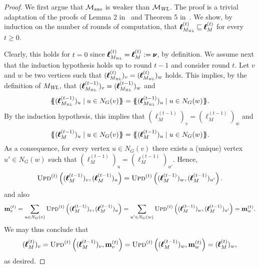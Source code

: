 \begin{proof}
We first argue that $\mathcal{M}_{\textsl{ano}}$ is weaker than $\mathcal{M}_{\textsl{WL}}$. The proof is a trivial adaptation of the proofs of Lemma 2 in~\cite{xhlj19} and Theorem 5 in~\cite{grohewl}. We show, by induction on the number of rounds of computation, that  $\pmb{\ell}_{M_{\textsl{WL}}}^{(t)}\sqsubseteq \pmb{\ell}_M^{(t)}$ for every $t\geq 0$.

Clearly, this holds for $t=0$ since $\pmb{\ell}_{M_{\textsl{WL}}}^{(t)}=\pmb{\ell}_M^{(t)}:=\pmb{\nu}$, by definition.
We assume next that the induction hypothesis holds up to round $t-1$ and consider round $t$.
Let $v$ and $w$ be two vertices such that 
$(\pmb{\ell}_{M_{\textsl{WL}}}^{(t)})_v=(\pmb{\ell}_{M_{\textsl{WL}}}^{(t)})_w$ holds.
This implies, by the definition of $M_{\textsl{WL}}$, that $(\pmb{\ell}_{M_{\textsl{WL}}}^{(t-1)})_v=(\pmb{\ell}_{M_{\textsl{WL}}}^{(t-1)})_w$  and
$$
\ldbl (\pmb{\ell}_{M_{\textsl{WL}}}^{(t-1)})_u\mid u\in N_G(v) \rdbl=
\ldbl (\pmb{\ell}_{M_{\textsl{WL}}}^{(t-1)})_u\mid u\in N_G(w) \rdbl.
$$
By the induction hypothesis, this implies that 
$(\pmb{\ell}_{M}^{(t-1)})_v=(\pmb{\ell}_{M}^{(t-1)})_w$  and
$$
\ldbl (\pmb{\ell}_{M}^{(t-1)})_u\mid u\in N_G(v) \rdbl=
\ldbl (\pmb{\ell}_{M}^{(t-1)})_u\mid u\in N_G(w) \rdbl.
$$
As a consequence, for every vertex $u\in N_G(v)$ there exists a (unique) vertex $u'\in N_G(w)$ such that $(\pmb{\ell}_{M}^{(t-1)})_u=(\pmb{\ell}_{M}^{(t-1)})_{u'}$. Hence,
$$
\textsc{Upd}^{(t)}\left((\pmb{\ell}_{M}^{(t-1)})_v,(\pmb{\ell}_{M}^{(t-1)})_u\right)=
\textsc{Upd}^{(t)}\left((\pmb{\ell}_{M}^{(t-1)})_w,(\pmb{\ell}_{M}^{(t-1)})_{u'}\right).
$$
and also
$$
\mathbf{m}^{(t)}_v=\sum_{u\in N_G(v)}\textsc{Upd}^{(t)}\left((\pmb{\ell}_{M}^{(t-1)})_v,(\pmb{\ell}_{M}^{(t-1)})_u\right)=\sum_{u'\in N_G(w)}\textsc{Upd}^{(t)}\left((\pmb{\ell}_{M}^{(t-1)})_w,(\pmb{\ell}_{M}^{(t-1)})_{u'}\right)=\mathbf{m}^{(t)}_w.
$$
We may thus conclude that $$(\pmb{\ell}_{M}^{(t)})_v=\textsc{Upd}^{(t)}\left((\pmb{\ell}_{M}^{(t-1)})_v,\mathbf{m}^{(t)}_v\right)=\textsc{Upd}^{(t)}\left((\pmb{\ell}_{M}^{(t-1)})_w,\mathbf{m}^{(t)}_w\right)=(\pmb{\ell}_{M}^{(t)})_w,
$$
as desired.
%

\end{proof}
